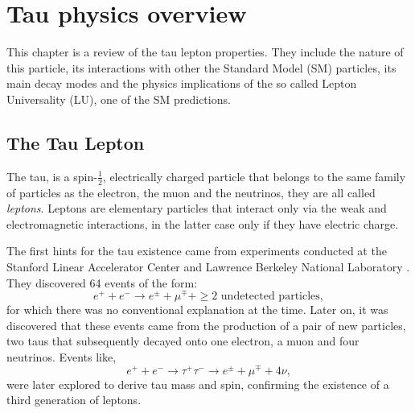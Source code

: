 \chapter{Tau physics overview}\label{chap:relatedwork}
This chapter is a review of the tau lepton properties. They include the nature of this particle, its interactions with other the Standard Model (SM) particles, its main decay modes and the physics implications of the so called Lepton Universality (LU), one of the SM predictions.  

\section{The Tau Lepton}\label{chap2sec1}
The tau, is a spin-$\frac{1}{2}$, electrically charged particle that belongs to the same family of particles as the electron, the muon and the neutrinos, they are all called \textit{leptons}. Leptons are elementary particles that interact only via the weak and electromagnetic interactions, in the latter case only if they have electric charge.  

The first hints for the tau existence came from experiments conducted at the Stanford Linear Accelerator Center and Lawrence Berkeley National Laboratory \cite{PhysRevLett.35.1489}. They discovered 64 events of the form:
\begin{equation}
	e^+ + e^- \to e^\pm + \mu^\mp + \geq \text{2 undetected particles},
\end{equation}
for which there was no conventional explanation at the time. Later on, it was discovered that these events came from the production of a pair of new particles, two taus that subsequently decayed onto one electron, a muon and four neutrinos. Events like,
\begin{equation}
e^+ + e^- \to \tau^+ \tau^- \to e^\pm + \mu^\mp + 4\nu,
\end{equation}	
were later explored to derive tau mass and spin, confirming the existence of a third generation of leptons. 

